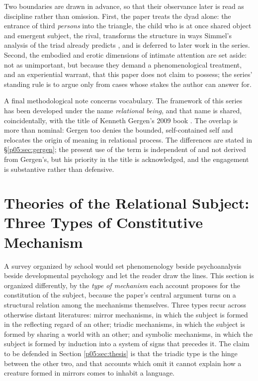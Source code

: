 \documentclass[11pt,a4paper]{article}
\theoremstyle{seriesthm}
\begin{document}
Two boundaries are drawn in advance, so that their observance later is read as discipline rather than omission. First, the paper treats the dyad alone: the entrance of third \emph{persons} into the triangle, the child who is at once shared object and emergent subject, the rival, transforms the structure in ways Simmel's analysis of the triad already predicts \parencite{simmel1950}, and is deferred to later work in the series. Second, the embodied and erotic dimensions of intimate attention are set aside: not as unimportant, but because they demand a phenomenological treatment, and an experiential warrant, that this paper does not claim to possess; the series' standing rule is to argue only from cases whose stakes the author can answer for.

A final methodological note concerns vocabulary. The framework of this series has been developed under the name \emph{relational being}, and that name is shared, coincidentally, with the title of Kenneth Gergen's 2009 book \parencite{gergen2009}. The overlap is more than nominal: Gergen too denies the bounded, self-contained self and relocates the origin of meaning in relational process. The differences are stated in §\ref{p05:sec:gergen}; the present use of the term is independent of and not derived from Gergen's, but his priority in the title is acknowledged, and the engagement is substantive rather than defensive.

\section{Theories of the Relational Subject: Three Types of Constitutive Mechanism}
\label{p05:sec:survey}

A survey organized by school would set phenomenology beside psychoanalysis beside developmental psychology and let the reader draw the lines. This section is organized differently, by the \emph{type of mechanism} each account proposes for the constitution of the subject, because the paper's central argument turns on a structural relation among the mechanisms themselves. Three types recur across otherwise distant literatures: mirror mechanisms, in which the subject is formed in the reflecting regard of an other; triadic mechanisms, in which the subject is formed by sharing a world with an other; and symbolic mechanisms, in which the subject is formed by induction into a system of signs that precedes it. The claim to be defended in Section \ref{p05:sec:thesis} is that the triadic type is the hinge between the other two, and that accounts which omit it cannot explain how a creature formed in mirrors comes to inhabit a language.
\end{document}
